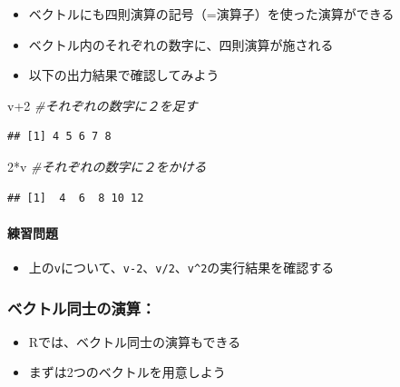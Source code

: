 \documentclass[
]{book}
\newenvironment{Shaded}{\begin{snugshade}}{\end{snugshade}}
\newcommand{\CommentTok}[1]{\textcolor[rgb]{0.56,0.35,0.01}{\textit{#1}}}
\newcommand{\DecValTok}[1]{\textcolor[rgb]{0.00,0.00,0.81}{#1}}
\newcommand{\NormalTok}[1]{#1}
\newcommand{\SpecialCharTok}[1]{\textcolor[rgb]{0.00,0.00,0.00}{#1}}
\providecommand{\tightlist}{%
  \setlength{\itemsep}{0pt}\setlength{\parskip}{0pt}}
\begin{document}
\begin{itemize}
\tightlist
\item
  ベクトルにも四則演算の記号（=演算子）を使った演算ができる
\item
  ベクトル内のそれぞれの数字に、四則演算が施される
\item
  以下の出力結果で確認してみよう
\end{itemize}

\begin{Shaded}
\begin{Highlighting}[]
\NormalTok{v}\SpecialCharTok{+}\DecValTok{2}  \CommentTok{\#それぞれの数字に２を足す }
\end{Highlighting}
\end{Shaded}

\begin{verbatim}
## [1] 4 5 6 7 8
\end{verbatim}

\begin{Shaded}
\begin{Highlighting}[]
\DecValTok{2}\SpecialCharTok{*}\NormalTok{v  }\CommentTok{\#それぞれの数字に２をかける  }
\end{Highlighting}
\end{Shaded}

\begin{verbatim}
## [1]  4  6  8 10 12
\end{verbatim}

\hypertarget{ux7df4ux7fd2ux554fux984c}{%
\paragraph*{練習問題}\label{ux7df4ux7fd2ux554fux984c}}

\begin{itemize}
\tightlist
\item
  上の\texttt{v}について、\texttt{v-2}、\texttt{v/2}、\texttt{v\^{}2}の実行結果を確認する
\end{itemize}

\hypertarget{ux30d9ux30afux30c8ux30ebux540cux58ebux306eux6f14ux7b97}{%
\subsubsection*{ベクトル同士の演算：}\label{ux30d9ux30afux30c8ux30ebux540cux58ebux306eux6f14ux7b97}}

\begin{itemize}
\tightlist
\item
  Rでは、ベクトル同士の演算もできる
\item
  まずは2つのベクトルを用意しよう
\end{itemize}
\end{document}
